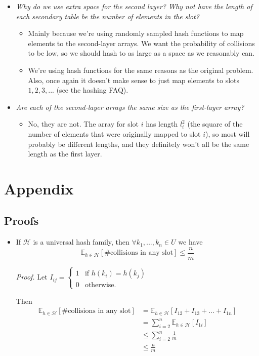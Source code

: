 \documentclass[11pt]{article}
\begin{document}
\begin{itemize}
\item \textit{Why do we use extra space for the second layer? Why not have the length of each secondary table be the number of elements in the slot?}
  \begin{itemize}
  \item Mainly because we're using randomly sampled hash functions to map elements to the second-layer arrays. We want the probability of collisions to be low, so we should hash to as large as a space as we reasonably can.
  \item We're using hash functions for the same reasons as the original problem. Also, once again it doesn't make sense to just map elements to slots $1, 2, 3, ...$ (see the hashing FAQ).
  \end{itemize}

\item \textit{Are each of the second-layer arrays the same size as the first-layer array?}
  \begin{itemize}
  \item No, they are not. The array for slot $i$ has length $l_i^2$ (the square of the number of elements that were originally mapped to slot $i$), so most will probably be different lengths, and they definitely won't all be the same length as the first layer.
  \end{itemize}
\end{itemize}

\newpage

\section*{Appendix}

\subsection*{Proofs}

\begin{itemize}
\item If $\mathcal{H}$ is a universal hash family, then $\forall k_1, ..., k_n \in U$ we have
$$\mathbb{E}_{h \in \mathcal{H}}[\text{\# collisions in any slot}] \leq \frac{n}{m}$$

\textit{Proof.} Let $I_{ij} =
\begin{cases}
1 & \text{if $h(k_i) = h(k_j)$} \\
0 & \text{otherwise.}
\end{cases}$

Then
\begin{align*}
\mathbb{E}_{h \in \mathcal{H}}[\text{\# collisions in any slot}] &= \mathbb{E}_{h \in \mathcal{H}}[I_{12} + I_{13} + ... + I_{1n}] \\
&= \sum_{i = 2}^n \mathbb{E}_{h \in \mathcal{H}}[I_{1i}] \\
&\leq \sum_{i = 2}^n \frac{1}{m} \\
&\leq \frac{n}{m}
\end{align*}
\end{itemize}
\end{document}
